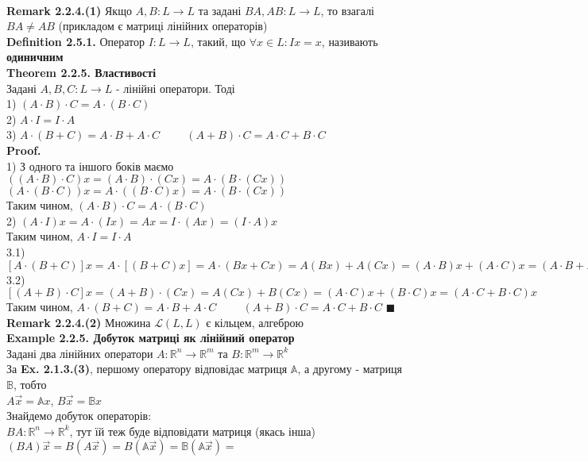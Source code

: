 \documentclass[a4paper, 14pt]{extarticle}
\def\defin#1{\textbf{Definition {#1}}}
\def\ex#1{\textbf{Example {#1}}}
\def\rm#1{\textbf{Remark {#1}}}
\def\th#1{\textbf{Theorem {#1}}}
\def\proof{\textbf{Proof.}\\}
\def\bigline{\vspace{5mm}\\}
\def\qed{$\blacksquare$}
\begin{document}
	\bigline
	\rm{2.2.4.(1)} Якщо $A,B: L \to L$ та задані $BA, AB: L \to L$, то взагалі $BA \neq AB$ (прикладом є матриці лінійних операторів)
	\bigline
	\defin{2.5.1.} Оператор $I: L \to L$, такий, що $\forall x \in L: Ix = x$, називають \textbf{одиничним}
	\bigline
	\th{2.2.5. Властивості}\\
	Задані $A,B,C: L \to L$ - лінійні оператори. Тоді\\
	1) $(A \cdot B) \cdot C = A \cdot (B \cdot C)$\\
	2) $A \cdot I = I \cdot A$\\
	3) $A \cdot (B+C) = A \cdot B + A \cdot C \hspace{1cm} (A+B) \cdot C = A \cdot C + B \cdot C$\\
	\proof
	1) З одного та іншого боків маємо\\
	$((A \cdot B) \cdot C) x = (A \cdot B) \cdot (Cx) = A \cdot (B \cdot (Cx))$\\
	$(A \cdot (B \cdot C)) x = A \cdot ( (B \cdot C) x) = A \cdot (B \cdot (Cx))$\\
	Таким чином, $(A \cdot B) \cdot C = A \cdot (B \cdot C)$
	\bigline
	2) $(A \cdot I) x = A \cdot (Ix) = A x = I \cdot (A x) = (I \cdot A) x$\\
	Таким чином, $A \cdot I = I \cdot A$
	\bigline
	3.1) $[A \cdot (B + C)]x = A \cdot [(B+C)x] = A \cdot (Bx + Cx) = A (Bx) + A (Cx) = (A \cdot B)x + (A \cdot C)x = (A \cdot B + A \cdot C)x$\\
	3.2) $[(A+B) \cdot C]x = (A+B) \cdot (Cx) = A (Cx) + B (Cx) = (A \cdot C)x + (B \cdot C)x = (A \cdot C + B \cdot C)x$\\
	Таким чином, $A \cdot (B+C) = A \cdot B + A \cdot C \hspace{1cm} (A+B) \cdot C = A \cdot C + B \cdot C$ \qed
	\bigline
	\rm{2.2.4.(2)} Множина $\mathcal{L}(L,L)$ є кільцем, алгеброю
	\bigline
	\ex{2.2.5. Добуток матриці як лінійний оператор}\\
	Задані два лінійних оператори $A: \mathbb{R}^n \to \mathbb{R}^m$ та $B: \mathbb{R}^m \to \mathbb{R}^k$\\
	За \textbf{Ex. 2.1.3.(3)}, першому оператору відповідає матриця $\mathbb{A}$, а другому - матриця $\mathbb{B}$, тобто\\
	$A\vec{x}=\mathbb{A}x$, $B\vec{x}=\mathbb{B}x$\\
	Знайдемо добуток операторів:\\
	$BA: \mathbb{R}^n \to \mathbb{R}^k$, тут їй теж буде відповідати матриця (якась інша)\\
	$(BA)\vec{x} = B(A\vec{x}) = B(\mathbb{A}\vec{x}) = \mathbb{B}(\mathbb{A}\vec{x}) \boxed{=} $\\
\end{document}
